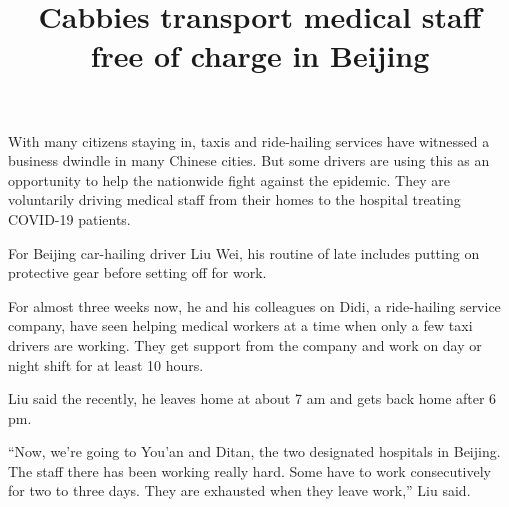 \documentclass{article}
\begin{document}
\title{Cabbies transport medical staff free of charge in Beijing}

\maketitle

With many citizens staying in, taxis and ride-hailing services have witnessed a business dwindle in many Chinese cities. But some drivers are using this as an opportunity to help the nationwide fight against the epidemic. They are voluntarily driving medical staff from their homes to the hospital treating COVID-19 patients.

For Beijing car-hailing driver Liu Wei, his routine of late includes putting on protective gear before setting off for work.

For almost three weeks now, he and his colleagues on Didi, a ride-hailing service company, have seen helping medical workers at a time when only a few taxi drivers are working. They get support from the company and work on day or night shift for at least 10 hours.

Liu said the recently, he leaves home at about 7 am and gets back home after 6 pm. 

``Now, we're going to You'an and Ditan, the two designated hospitals in Beijing. The staff there has been working really hard. Some have to work consecutively for two to three days. They are exhausted when they leave work,'' Liu said.
\end{document}
